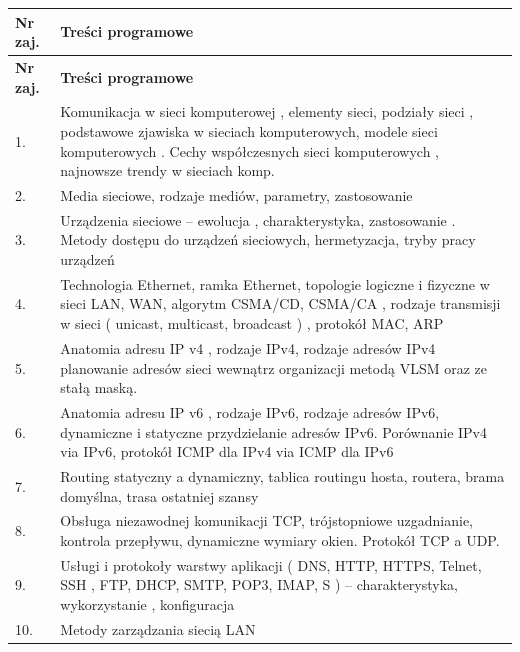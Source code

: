 \documentclass[12pt, a4paper]{article}
\newcommand{\thdrule}{\noalign{\global\setlength{\extrarowheight}{0pt}}}
\newcommand{\thdend}{\noalign{\global\setlength{\extrarowheight}{3pt}}}
\begin{document}
{\scriptsize
\begin{longtable}{m{1.5cm}m{14.5cm}}
\thdrule\toprule
\rowcolor{pjatkRed} {\color{white}\textbf{Nr zaj.}} & {\color{white}\textbf{Treści programowe}} \\
\midrule\thdend
\endfirsthead
\thdrule\toprule
\rowcolor{pjatkRed} {\color{white}\textbf{Nr zaj.}} & {\color{white}\textbf{Treści programowe}} \\
\midrule\thdend
\endhead
  \rowcolor{tableRowLight} 1. & Komunikacja w sieci komputerowej , elementy sieci, podziały sieci , podstawowe zjawiska w sieciach komputerowych, modele sieci komputerowych . Cechy współczesnych sieci komputerowych , najnowsze trendy w sieciach komp. \\
  \rowcolor{tableRowAlt} 2. & Media sieciowe, rodzaje mediów,  parametry, zastosowanie \\
  \rowcolor{tableRowLight} 3. & Urządzenia sieciowe – ewolucja , charakterystyka, zastosowanie . Metody dostępu do urządzeń sieciowych, hermetyzacja, tryby pracy urządzeń \\
  \rowcolor{tableRowAlt} 4. & Technologia Ethernet, ramka Ethernet,  topologie logiczne i fizyczne w sieci LAN, WAN, algorytm CSMA/CD, CSMA/CA , rodzaje transmisji w sieci ( unicast, multicast, broadcast ) ,  protokół MAC, ARP \\
  \rowcolor{tableRowLight} 5. & Anatomia adresu IP v4 , rodzaje  IPv4, rodzaje adresów IPv4   planowanie adresów  sieci wewnątrz organizacji metodą VLSM oraz ze stałą maską. \\
  \rowcolor{tableRowAlt} 6. & Anatomia adresu IP v6 , rodzaje  IPv6,  rodzaje adresów IPv6, dynamiczne i statyczne przydzielanie adresów IPv6. Porównanie IPv4 via IPv6, protokół ICMP dla IPv4 via ICMP dla IPv6 \\
  \rowcolor{tableRowLight} 7. & Routing statyczny a dynamiczny, tablica routingu hosta, routera, brama domyślna, trasa ostatniej szansy \\
  \rowcolor{tableRowAlt} 8. & Obsługa niezawodnej komunikacji TCP, trójstopniowe uzgadnianie, kontrola przepływu, dynamiczne wymiary okien. Protokół TCP a UDP. \\
  \rowcolor{tableRowLight} 9. & Usługi i protokoły warstwy aplikacji ( DNS, HTTP, HTTPS, Telnet, SSH , FTP, DHCP, SMTP, POP3, IMAP, S ) – charakterystyka, wykorzystanie , konfiguracja \\
  \rowcolor{tableRowAlt} 10. & Metody zarządzania siecią LAN \\
\bottomrule
\end{longtable}}
\end{document}
